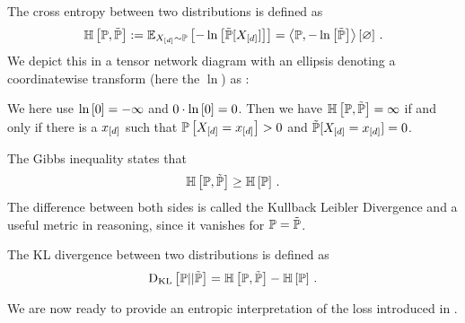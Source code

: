 \begin{definition}\label{def:crossEntropy}
	The cross entropy between two distributions is defined as 
		\[ \mathbb{H}\left[\mathbb{P},\tilde{\mathbb{P}}\right] 
		:=  \mathbb{E}_{X_{[d]}\sim\mathbb{P}}\left[-\ln \left[ \tilde{\mathbb{P}}[X_{[d]}] \right]\right] 
		= \left\langle \mathbb{P},-\ln \left[ \tilde{\mathbb{P}} \right]\right\rangle \left[ \varnothing \right] \, . \]
	We depict this in a tensor network diagram with an ellipsis denoting a coordinatewise transform (here the $\ln$) as :
	\begin{center}
		
	\end{center}
\end{definition}

We here use $\ln \left[ 0 \right]=-\infty$ and $0\cdot \ln \left[ 0 \right] = 0$. 
Then we have $\mathbb{H}\left[\mathbb{P},\tilde{\mathbb{P}}\right] = \infty$ if and only if there is a $x_{[d]}$ such that $\mathbb{P}\left[X_{[d]}=x_{[d]}\right]>0$ and $\tilde{\mathbb{P}}[X_{[d]}=x_{[d]}]=0$.


The Gibbs inequality states that
		\[ \mathbb{H}\left[\mathbb{P},\tilde{\mathbb{P}}\right] \geq \mathbb{H}\left[\mathbb{P}\right] \, . \]
The difference between both sides is called the Kullback Leibler Divergence and a useful metric in reasoning, since it vanishes for $\mathbb{P}=\tilde{\mathbb{P}}$.

\begin{definition}\label{def:KLDivergence}
	The KL divergence between two distributions is defined as 
		\[ \mathrm{D}_{\mathrm{KL}}\left[ \mathbb{P} || \tilde{\mathbb{P}} \right] = \mathbb{H}\left[\mathbb{P},\tilde{\mathbb{P}}\right] - \mathbb{H}\left[\mathbb{P}\right]  \, . \]
\end{definition}

We are now ready to provide an entropic interpretation of the loss introduced in .

